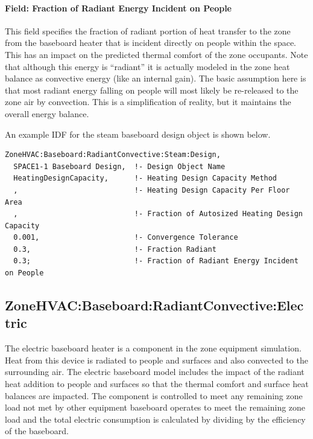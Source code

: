 \paragraph{Field: Fraction of Radiant Energy Incident on People}\label{field-fraction-of-radiant-energy-incident-on-people-1}

This field specifies the fraction of radiant portion of heat transfer to the zone from the baseboard heater that is incident directly on people within the space. This has an impact on the predicted thermal comfort of the zone occupants. Note that although this energy is ``radiant'' it is actually modeled in the zone heat balance as convective energy (like an internal gain). The basic assumption here is that most radiant energy falling on people will most likely be re-released to the zone air by convection. This is a simplification of reality, but it maintains the overall energy balance.

An example IDF for the steam baseboard design object is shown below.

\begin{lstlisting}
ZoneHVAC:Baseboard:RadiantConvective:Steam:Design,
  SPACE1-1 Baseboard Design,  !- Design Object Name
  HeatingDesignCapacity,      !- Heating Design Capacity Method
  ,                           !- Heating Design Capacity Per Floor Area
  ,                           !- Fraction of Autosized Heating Design Capacity
  0.001,                      !- Convergence Tolerance
  0.3,                        !- Fraction Radiant
  0.3;                        !- Fraction of Radiant Energy Incident on People
\end{lstlisting}

\subsection{ZoneHVAC:Baseboard:RadiantConvective:Electric}\label{zonehvacbaseboardradiantconvectiveelectric}

The electric baseboard heater is a component in the zone equipment simulation. Heat from this device is radiated to people and surfaces and also convected to the surrounding air. The electric baseboard model includes the impact of the radiant heat addition to people and surfaces so that the thermal comfort and surface heat balances are impacted. The component is controlled to meet any remaining zone load not met by other equipment baseboard operates to meet the remaining zone load and the total electric consumption is calculated by dividing by the efficiency of the baseboard.

